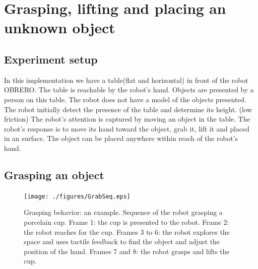 


%

\section{Grasping, lifting and placing an unknown object}
\label{sec:controlling}
%
\subsection{Experiment setup} In this implementation we have a
table(flat and horizontal) in front of the robot OBRERO. The table
is reachable by the robot's hand. Objects are presented by a
person on this table. The robot does not have a model of the
objects presented.
%
The robot initially detect the presence of the table and determine
its height. (low friction)
%
The robot's attention is captured by moving an object in the
table. The robot's response is to move its hand toward the object,
grab it, lift it and placed in an surface.
%
The object can be placed anywhere within reach of the robot's
hand.
%



\subsection{Grasping an object}
\label{sec:impbehavior}

\begin{figure}[htbp]
\centerline{
\texttt{[image: ./figures/GrabSeq.eps]}
} \caption[An example of the Grasping Behavior]{Grasping behavior:
an example. Sequence of the robot grasping a porcelain cup. Frame
1: the cup is presented to the robot. Frame 2: the robot reaches
for the cup. Frames 3 to 6: the robot explores the space and uses
tactile feedback to find the object and adjust the position of the
hand. Frames 7 and 8: the robot grasps and lifts the cup.}
\label{fig:sequence}
\end{figure}

